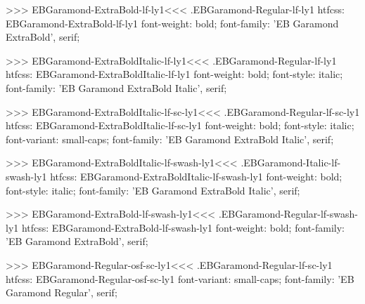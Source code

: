 {{>>>
\<EBGaramond-ExtraBold-lf-ly1\><<<
.EBGaramond-Regular-lf-ly1
htfcss:  EBGaramond-ExtraBold-lf-ly1  font-weight: bold; font-family: 'EB Garamond ExtraBold', serif;

>>>
\<EBGaramond-ExtraBoldItalic-lf-ly1\><<<
.EBGaramond-Regular-lf-ly1
htfcss:  EBGaramond-ExtraBoldItalic-lf-ly1  font-weight: bold; font-style: italic; font-family: 'EB Garamond ExtraBold Italic', serif;

>>>
\<EBGaramond-ExtraBoldItalic-lf-sc-ly1\><<<
.EBGaramond-Regular-lf-sc-ly1
htfcss:  EBGaramond-ExtraBoldItalic-lf-sc-ly1  font-weight: bold; font-style: italic; font-variant: small-caps; font-family: 'EB Garamond ExtraBold Italic', serif;

>>>
\<EBGaramond-ExtraBoldItalic-lf-swash-ly1\><<<
.EBGaramond-Italic-lf-swash-ly1
htfcss:  EBGaramond-ExtraBoldItalic-lf-swash-ly1  font-weight: bold; font-style: italic; font-family: 'EB Garamond ExtraBold Italic', serif;

>>>
\<EBGaramond-ExtraBold-lf-swash-ly1\><<<
.EBGaramond-Regular-lf-swash-ly1
htfcss:  EBGaramond-ExtraBold-lf-swash-ly1  font-weight: bold; font-family: 'EB Garamond ExtraBold', serif;

>>>
\<EBGaramond-Regular-osf-sc-ly1\><<<
.EBGaramond-Regular-lf-sc-ly1
htfcss:  EBGaramond-Regular-osf-sc-ly1  font-variant: small-caps; font-family: 'EB Garamond Regular', serif;

}}
